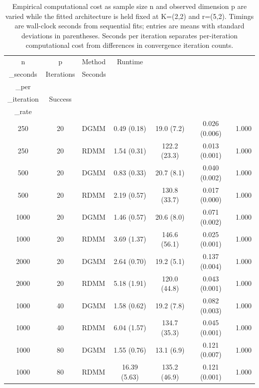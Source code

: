 \begin{table}[!ht]
\centering
\caption{Empirical computational cost as sample size n and observed dimension p are varied while the fitted architecture is held fixed at K=(2,2) and r=(5,2). Timings are wall-clock seconds from sequential fits; entries are means with standard deviations in parentheses. Seconds per iteration separates per-iteration computational cost from differences in convergence iteration counts.}
\label{tab:computational-cost}
\begin{tabular}{c c l c c c c}
\hline
n & p & Method & Runtime\\_seconds & Iterations & Seconds\\_per\\_iteration & Success\\_rate \\
\hline
250 & 20 & DGMM & 0.49 (0.18) & 19.0 (7.2) & 0.026 (0.006) & 1.000 \\
250 & 20 & RDMM & 1.54 (0.31) & 122.2 (23.3) & 0.013 (0.001) & 1.000 \\
500 & 20 & DGMM & 0.83 (0.33) & 20.7 (8.1) & 0.040 (0.002) & 1.000 \\
500 & 20 & RDMM & 2.19 (0.57) & 130.8 (33.7) & 0.017 (0.000) & 1.000 \\
1000 & 20 & DGMM & 1.46 (0.57) & 20.6 (8.0) & 0.071 (0.002) & 1.000 \\
1000 & 20 & RDMM & 3.69 (1.37) & 146.6 (56.1) & 0.025 (0.001) & 1.000 \\
2000 & 20 & DGMM & 2.64 (0.70) & 19.2 (5.1) & 0.137 (0.004) & 1.000 \\
2000 & 20 & RDMM & 5.18 (1.91) & 120.0 (44.8) & 0.043 (0.001) & 1.000 \\
1000 & 40 & DGMM & 1.58 (0.62) & 19.2 (7.8) & 0.082 (0.003) & 1.000 \\
1000 & 40 & RDMM & 6.04 (1.57) & 134.7 (35.3) & 0.045 (0.001) & 1.000 \\
1000 & 80 & DGMM & 1.55 (0.76) & 13.1 (6.9) & 0.121 (0.007) & 1.000 \\
1000 & 80 & RDMM & 16.39 (5.63) & 135.2 (46.9) & 0.121 (0.001) & 1.000 \\
\hline
\end{tabular}
\end{table}
